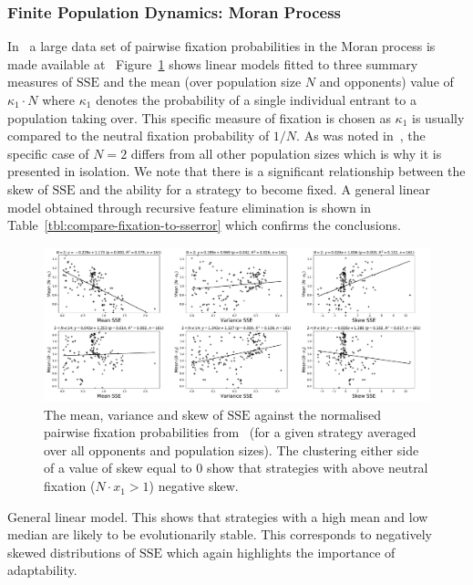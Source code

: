 \documentclass[a4paper]{article}
\newcommand{\SSe}{\text{SSE}}
\begin{document}
\subsubsection{Finite Population Dynamics: Moran Process}

In~\cite{Moran1707} a large data set of pairwise fixation probabilities in the
Moran process is made available at~\cite{vincent_knight_2017_1040129}
Figure~\ref{fig:compare-fixation-to-sserror} shows linear models fitted to three
summary measures of \(\SSe\) and the mean (over population size \(N\) and
opponents) value of \(\kappa_1\cdot N\) where \(\kappa_1\) denotes the
probability of a single individual entrant to a population taking over. This
specific measure of fixation is chosen as \(\kappa_1\) is usually compared to
the neutral fixation probability of \(1 / N\).  As was noted
in~\cite{Moran1707}, the specific case of \(N=2\) differs from all other
population sizes which is why it is presented in isolation.  We note that there
is a significant relationship between the skew of \(\SSe\) and the ability for a
strategy to become fixed.  A general linear model obtained through recursive
feature elimination is shown in Table~\ref{tbl:compare-fixation-to-sserror}
which confirms the conclusions.

\begin{figure}[!hbtp]
    \centering
    \includegraphics[width=\textwidth]{./assets/img/compare-fixation-to-sserror/main.pdf}
    \caption{The mean, variance and skew of
    \(\SSe\) against the normalised pairwise fixation probabilities
    from~\cite{Moran1707} (for a given strategy averaged over all opponents and
    population sizes). The clustering either side of a value of skew equal to
    0 show that strategies with above neutral
    fixation (\(N\cdot x_1>1\)) negative skew.}
    \label{fig:compare-fixation-to-sserror}
\end{figure}

\begin{table}[!hbtp]
    \begin{center}
    \tiny
    
    \end{center}
    \caption{General linear model. This shows that strategies with a high mean
        and low median are likely to be evolutionarily stable. This corresponds
        to negatively skewed distributions of \(\SSe\) which again highlights
        the importance of adaptability.}
    \label{tbl:compare-fixation-to-sserror}
\end{table}
\end{document}
